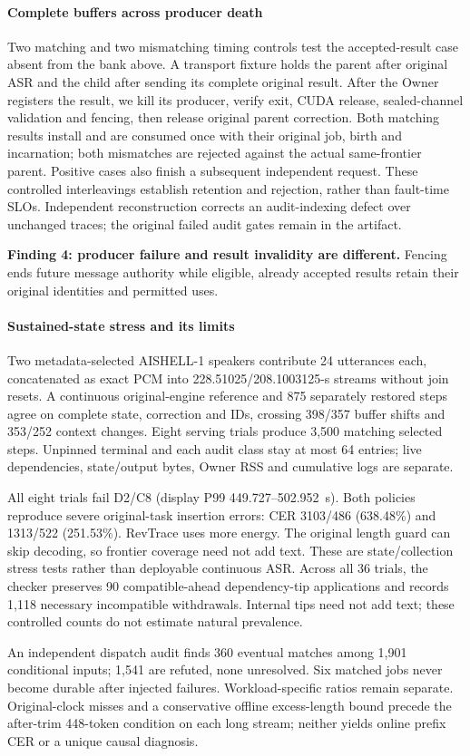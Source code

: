 \paragraph{Complete buffers across producer death}
Two matching and two mismatching timing controls test the accepted-result
case absent from the bank above. A transport fixture holds the parent
after original ASR and the child after sending its complete original
result. After the Owner registers the result, we kill its producer,
verify exit, CUDA release, sealed-channel validation and fencing, then
release original parent correction. Both matching results install and
are consumed once with their original job, birth and incarnation; both
mismatches are rejected against the actual same-frontier parent. Positive
cases also finish a subsequent independent request. These controlled
interleavings establish retention and rejection, rather than fault-time
SLOs. Independent reconstruction corrects an audit-indexing defect over
unchanged traces; the original failed audit gates remain in the artifact.
\par\noindent\textbf{Finding 4: producer failure and result invalidity are different.}
Fencing ends future message authority while eligible, already accepted
results retain their original identities and permitted uses.

\paragraph{Sustained-state stress and its limits}
Two metadata-selected AISHELL-1 speakers contribute 24 utterances each,
concatenated as exact PCM into 228.51025/208.1003125-s streams without join
resets. A continuous original-engine reference and 875 separately restored
steps agree on complete state, correction and IDs, crossing 398/357 buffer
shifts and 353/252 context changes. Eight serving trials produce 3,500
matching selected steps. Unpinned terminal and each audit class stay at
most 64 entries; live dependencies, state/output bytes, Owner RSS and
cumulative logs are separate.

All eight trials fail D2/C8 (display P99 449.727--502.952~s). Both policies
reproduce severe original-task insertion errors: CER 3103/486 (638.48\%)
and 1313/522 (251.53\%). RevTrace uses more energy. The original length
guard can skip decoding, so frontier coverage need not add text. These
are state/collection stress tests rather than deployable continuous ASR.
Across all 36 trials, the checker preserves 90 compatible-ahead
dependency-tip applications and records 1,118 necessary incompatible
withdrawals. Internal tips need not add text; these controlled counts
do not estimate natural prevalence.

An independent dispatch audit finds 360 eventual matches among 1,901
conditional inputs; 1,541 are refuted, none unresolved. Six matched jobs
never become durable after injected failures. Workload-specific ratios
remain separate. Original-clock misses and a conservative offline
excess-length bound precede the after-trim 448-token condition on each
long stream; neither yields online prefix CER or a unique causal diagnosis.
